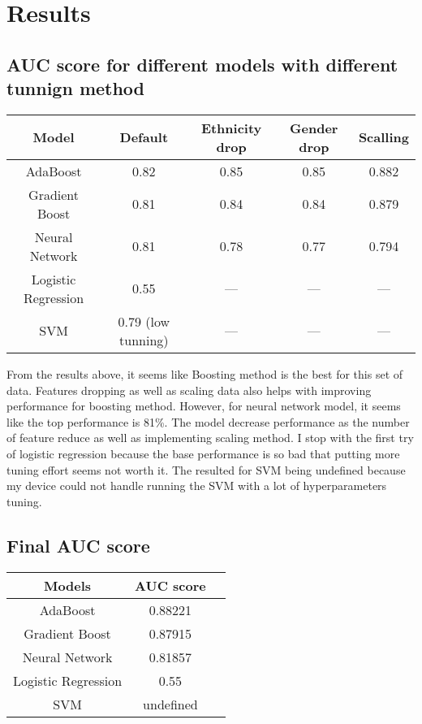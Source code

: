 \documentclass{article}
\begin{document}
\section{Results}
\subsection{AUC score for different models with different tunnign method}
\begin{center}
\begin{tabular}{|c|c|c|c|c|}
\hline
Model&  Default  & Ethnicity drop & Gender drop & Scalling\\
\hline
AdaBoost & 0.82 & 0.85 & 0.85 & 0.882\\
Gradient Boost & 0.81 & 0.84 & 0.84 & 0.879\\
Neural Network & 0.81 & 0.78 & 0.77 & 0.794 \\
Logistic Regression & 0.55 & --- & --- & --- \\
SVM & 0.79 (low tunning) & --- & --- & ---  \\
\hline
\end{tabular}
\end{center}
From the results above, it seems like Boosting method is the best for this set of data. Features dropping as well as scaling data also helps with improving performance for boosting method. However, for neural network model, it seems like the top performance is 81\%. The model decrease performance as the number of feature reduce as well as implementing scaling method. I stop with the first try of logistic regression because the base performance is so bad that putting more tuning effort seems not worth it. The resulted for SVM being  undefined because my device could not handle running the SVM with a lot of hyperparameters tuning. 
\subsection{Final AUC score}
\begin{center}
\begin{tabular}{|c|c|c}

Models  & AUC score\\
\hline
AdaBoost & 0.88221\\

Gradient Boost &  0.87915\\

Neural Network & 0.81857 \\

Logistic Regression & 0.55\\

SVM & undefined \\

\end{tabular}
\end{center}
\end{document}
